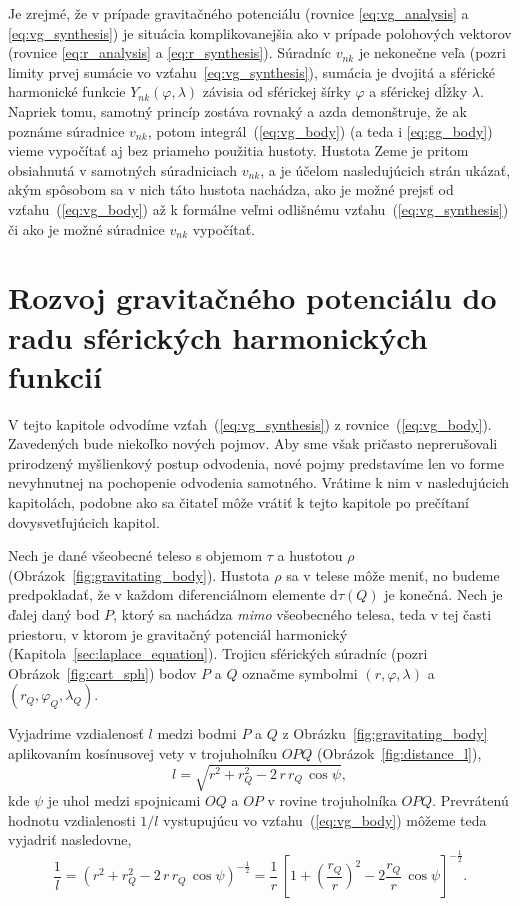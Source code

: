 \documentclass[a4paper, 12pt]{book}
\newcommand{\diff}{\mathrm d}
\begin{document}
Je zrejmé, že v prípade gravitačného potenciálu (rovnice \ref{eq:vg_analysis} 
a \ref{eq:vg_synthesis}) je situácia komplikovanejšia ako v prípade polohových 
vektorov (rovnice \ref{eq:r_analysis} a \ref{eq:r_synthesis}).  Súradníc 
$v_{nk}$ je nekonečne veľa (pozri limity prvej sumácie vo 
vzťahu~\ref{eq:vg_synthesis}), sumácia je dvojitá a sférické harmonické funkcie 
$Y_{nk}(\varphi, \lambda)$ závisia od sférickej šírky $\varphi$ a sférickej 
dĺžky $\lambda$.  Napriek tomu, samotný princíp zostáva rovnaký a azda 
demonštruje, že ak poznáme súradnice $v_{nk}$, potom 
integrál~(\ref{eq:vg_body}) (a teda i \ref{eq:gg_body}) vieme vypočítať aj bez 
priameho použitia hustoty.  Hustota Zeme je pritom obsiahnutá v samotných 
súradniciach $v_{nk}$, a je účelom nasledujúcich strán ukázať, akým spôsobom sa 
v nich táto hustota nachádza, ako je možné prejsť od vzťahu~(\ref{eq:vg_body}) 
až k formálne veľmi odlišnému vzťahu~(\ref{eq:vg_synthesis}) či ako je možné 
súradnice $v_{nk}$ vypočítať.



\section{Rozvoj gravitačného potenciálu do radu sférických harmonických 
funkcií}
\label{sec:vg_sh_expansion}

V tejto kapitole odvodíme vzťah~(\ref{eq:vg_synthesis}) 
z rovnice~(\ref{eq:vg_body}).  Zavedených bude niekoľko nových pojmov.  Aby sme 
však pričasto neprerušovali prirodzený myšlienkový postup odvodenia, nové pojmy 
predstavíme len vo forme nevyhnutnej na pochopenie odvodenia samotného.  
Vrátime k nim v nasledujúcich kapitolách, podobne ako sa čitateľ môže vrátiť 
k tejto kapitole po prečítaní dovysvetľujúcich kapitol.

Nech je dané všeobecné teleso s objemom $\tau$ a hustotou $\rho$ 
(Obrázok~\ref{fig:gravitating_body}).  Hustota $\rho$ sa v telese môže meniť, 
no budeme predpokladať, že v každom diferenciálnom elemente $\diff \tau(Q)$ je 
konečná.  Nech je ďalej daný bod $P$, ktorý sa nachádza \emph{mimo} všeobecného 
telesa, teda v tej časti priestoru, v ktorom je gravitačný potenciál harmonický 
(Kapitola~\ref{sec:laplace_equation}).  Trojicu sférických súradníc (pozri 
Obrázok~\ref{fig:cart_sph}) bodov $P$ a $Q$ označme symbolmi $(r, \varphi, 
\lambda)$ a $(r_Q, \varphi_Q, \lambda_Q)$.

Vyjadrime vzdialenosť $l$ medzi bodmi $P$ a $Q$ 
z Obrázku~\ref{fig:gravitating_body} aplikovaním kosínusovej vety 
v trojuholníku $OPQ$ (Obrázok~\ref{fig:distance_l}),
%
\begin{equation}
l = \sqrt{r^2 + r_Q^2 - 2 \, r \, r_Q \, \cos\psi}{,}
\end{equation}
%
kde $\psi$ je uhol medzi spojnicami $OQ$ a $OP$ v rovine trojuholníka $OPQ$.  
Prevrátenú hodnotu vzdialenosti $1 \slash l$ vystupujúcu vo 
vzťahu~(\ref{eq:vg_body}) môžeme teda vyjadriť nasledovne,
%
\begin{equation}
\label{eq:1l}
\frac{1}{l} = \left( r^2 + r_Q^2 - 2 \, r \, r_Q \, \cos\psi 
\right)^{-\frac{1}{2}} = \frac{1}{r} \, \left[1 + \left( \dfrac{r_Q}{r} 
\right)^2 - 2 \dfrac{r_Q}{r} \, \cos\psi \right]^{-\frac{1}{2}}{.}
\end{equation}
\end{document}

